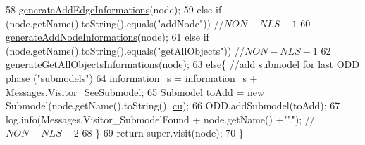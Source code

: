 \begin{DoxyCode}
58             \hyperlink{classit_1_1isislab_1_1masonhelperdocumentation_1_1visitor_1_1_start_method_visitor_af17c1a78f8f3ae828a9f539c7e53143b}{generateAddEdgeInformations}(node);
59         \textcolor{keywordflow}{else} \textcolor{keywordflow}{if} (node.getName().toString().equals(\textcolor{stringliteral}{"addNode"})) \textcolor{comment}{//$NON-NLS-1$}
60             \hyperlink{classit_1_1isislab_1_1masonhelperdocumentation_1_1visitor_1_1_start_method_visitor_ad982e1712d02c4c26aeb54a6d45391e7}{generateAddNodeInformations}(node);
61         \textcolor{keywordflow}{else} \textcolor{keywordflow}{if} (node.getName().toString().equals(\textcolor{stringliteral}{"getAllObjects"})) \textcolor{comment}{//$NON-NLS-1$}
62             \hyperlink{classit_1_1isislab_1_1masonhelperdocumentation_1_1visitor_1_1_start_method_visitor_a50c1310c51f4e9950e5133c9cd4a3e6c}{generateGetAllObjectsInformations}(node);
63         \textcolor{keywordflow}{else}\{   \textcolor{comment}{//add submodel for last ODD phase ("submodels")}
64             \hyperlink{classit_1_1isislab_1_1masonhelperdocumentation_1_1visitor_1_1_start_method_visitor_a59b86134adb11f995ce96c1a96b51d50}{information\_s} = \hyperlink{classit_1_1isislab_1_1masonhelperdocumentation_1_1visitor_1_1_start_method_visitor_a59b86134adb11f995ce96c1a96b51d50}{information\_s} + 
      \hyperlink{classit_1_1isislab_1_1masonhelperdocumentation_1_1visitor_1_1_messages_aed5979e297f8a4e922f7d82d69d2929c}{Messages.Visitor\_SeeSubmodel};
65             Submodel toAdd = \textcolor{keyword}{new} Submodel(node.getName().toString(), \hyperlink{classit_1_1isislab_1_1masonhelperdocumentation_1_1visitor_1_1_start_method_visitor_a4111ccaff10a4938df4ff668149e92ad}{cu});
66             ODD.addSubmodel(toAdd);
67             log.info(Messages.Visitor\_SubmodelFound + node.getName() +\textcolor{stringliteral}{"'."});             \textcolor{comment}{//$NON-NLS-2$}
68         \}
69         \textcolor{keywordflow}{return} super.visit(node);
70     \}
\end{DoxyCode}


